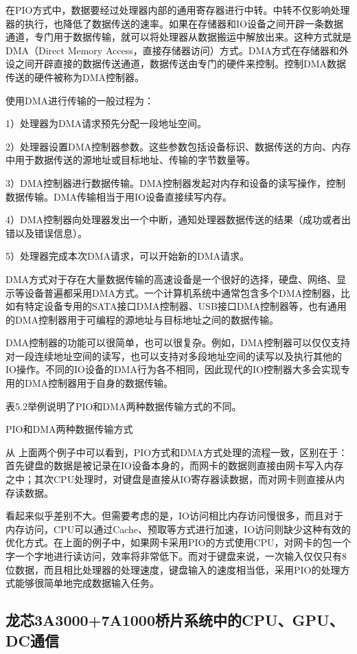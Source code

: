 \documentclass[]{ctexbook}
\begin{document}
在PIO方式中，数据要经过处理器内部的通用寄存器进行中转。中转不仅影响处理器的执行，也降低了数据传送的速率。如果在存储器和IO设备之间开辟一条数据通道，专门用于数据传输，就可以将处理器从数据搬运中解放出来。这种方式就是DMA（Direct Memory Access，直接存储器访问）方式。DMA方式在存储器和外设之间开辟直接的数据传送通道，数据传送由专门的硬件来控制。控制DMA数据传送的硬件被称为DMA控制器。

使用DMA进行传输的一般过程为：

1）处理器为DMA请求预先分配一段地址空间。

2）处理器设置DMA控制器参数。这些参数包括设备标识、数据传送的方向、内存中用于数据传送的源地址或目标地址、传输的字节数量等。

3）DMA控制器进行数据传输。DMA控制器发起对内存和设备的读写操作，控制数据传输。DMA传输相当于用IO设备直接续写内存。

4）DMA控制器向处理器发出一个中断，通知处理器数据传送的结果（成功或者出错以及错误信息）。

5）处理器完成本次DMA请求，可以开始新的DMA请求。

DMA方式对于存在大量数据传输的高速设备是一个很好的选择，硬盘、网络、显示等设备普遍都采用DMA方式。一个计算机系统中通常包含多个DMA控制器，比如有特定设备专用的SATA接口DMA控制器、USB接口DMA控制器等，也有通用的DMA控制器用于可编程的源地址与目标地址之间的数据传输。

DMA控制器的功能可以很简单，也可以很复杂。例如，DMA控制器可以仅仅支持对一段连续地址空间的读写，也可以支持对多段地址空间的读写以及执行其他的IO操作。不同的IO设备的DMA行为各不相同，因此现代的IO控制器大多会实现专用的DMA控制器用于自身的数据传输。

表5.2举例说明了PIO和DMA两种数据传输方式的不同。

\label{tab:pio-vs-dma}PIO和DMA两种数据传输方式

从
上面两个例子中可以看到，PIO方式和DMA方式处理的流程一致，区别在于：首先键盘的数据是被记录在IO设备本身的，而网卡的数据则直接由网卡写入内存之中；其次CPU处理时，对键盘是直接从IO寄存器读数据，而对网卡则直接从内存读数据。

看起来似乎差别不大。但需要考虑的是，IO访问相比内存访问慢很多，而且对于内存访问，CPU可以通过Cache、预取等方式进行加速，IO访问则缺少这种有效的优化方式。在上面的例子中，如果网卡采用PIO的方式使用CPU，对网卡的包一个字一个字地进行读访问，效率将非常低下。而对于键盘来说，一次输入仅仅只有8位数据，而且相比处理器的处理速度，键盘输入的速度相当低，采用PIO的处理方式能够很简单地完成数据输入任务。

\hypertarget{ux9f99ux82af3a30007a1000ux6865ux7247ux7cfbux7edfux4e2dux7684cpugpudcux901aux4fe1}{%
\subsection{龙芯3A3000+7A1000桥片系统中的CPU、GPU、DC通信}\label{ux9f99ux82af3a30007a1000ux6865ux7247ux7cfbux7edfux4e2dux7684cpugpudcux901aux4fe1}}
\end{document}
